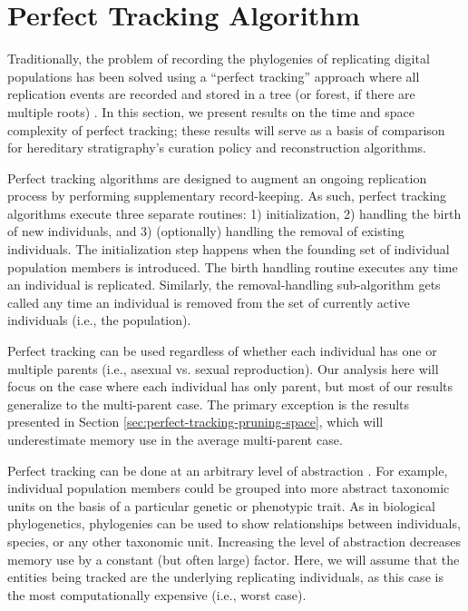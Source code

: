 \section{Perfect Tracking Algorithm} \label{sec:perfect-tracking-algorithm}

Traditionally, the problem of recording the phylogenies of replicating digital populations has been solved using a ``perfect tracking'' approach where all replication events are recorded and stored in a tree (or forest, if there are multiple roots) \citep{dolson2023phylotrackpy}.
In this section, we present results on the time and space complexity of perfect tracking;
these results will serve as a basis of comparison for hereditary stratigraphy's curation policy and reconstruction algorithms.

Perfect tracking algorithms are designed to augment an ongoing replication process by performing supplementary record-keeping.
As such, perfect tracking algorithms execute three separate routines: 1) initialization, 2) handling the birth of new individuals, and 3) (optionally) handling the removal of existing individuals.
The initialization step happens when the founding set of individual population members is introduced.
The birth handling routine executes any time an individual is replicated.
Similarly, the removal-handling sub-algorithm gets called any time an individual is removed from the set of currently active individuals (i.e., the population).

Perfect tracking can be used regardless of whether each individual has one or multiple parents (i.e., asexual vs. sexual reproduction).
Our analysis here will focus on the case where each individual has only parent, but most of our results generalize to the multi-parent case.
The primary exception is the results presented in Section \ref{sec:perfect-tracking-pruning-space}, which will underestimate memory use in the average multi-parent case.

Perfect tracking can be done at an arbitrary level of abstraction \citep{dolson2020interpreting, dolson2023phylotrackpy}.
For example, individual population members could be grouped into more abstract taxonomic units on the basis of a particular genetic or phenotypic trait.
As in biological phylogenetics, phylogenies can be used to show relationships between individuals, species, or any other taxonomic unit.
Increasing the level of abstraction decreases memory use by a constant (but often large) factor.
Here, we will assume that the entities being tracked are the underlying replicating individuals, as this case is the most computationally expensive (i.e., worst case).

